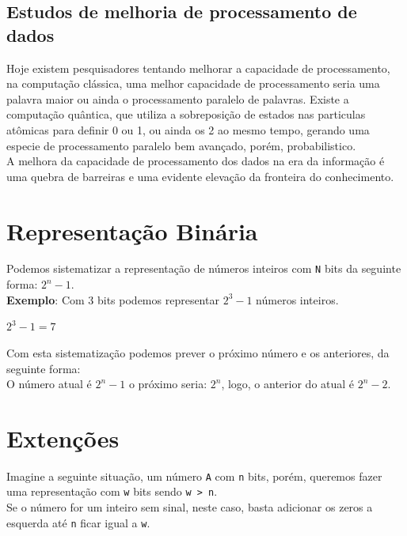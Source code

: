 \documentclass[12pt, onecolumn]{article}
\begin{document}
	\subsection{\centering Estudos de melhoria de processamento de dados}
	
	Hoje existem pesquisadores tentando melhorar a capacidade de processamento, 
	na computação clássica, uma melhor capacidade de processamento 
	seria uma palavra maior ou ainda o processamento paralelo de palavras. 
	Existe a computação quântica, que utiliza a sobreposição de estados 
	nas particulas atômicas para definir 0 ou 1, ou ainda os 2 ao mesmo 
	tempo, gerando uma especie de processamento paralelo bem avançado, 
	porém, probabilistico. \\
	\newline
	A melhora da capacidade de processamento dos dados na era da informação 
	é uma quebra de barreiras e uma evidente elevação da fronteira do 
	conhecimento.
		
	\section{\centering Representação Binária}
	
	Podemos sistematizar a representação de números inteiros com \texttt{N} bits
	da seguinte forma: $2^{n} - 1$. \\
	\newline
	\textbf{Exemplo}: Com 3 bits podemos representar $2^{3} - 1$ números 
	inteiros.
	\begin{center} 
		$2^{3} - 1 = 7$ \\
	\end{center}
	Com esta sistematização podemos prever o próximo número e os anteriores, 
	da seguinte forma: \\
	\newline
	O número atual é $2^{n} - 1$ o próximo seria: $2^{n}$, logo, o anterior
	do atual é $2^{n} - 2$.

	\section{\centering Extenções}
	
	Imagine a seguinte situação, um número \texttt{A} com \texttt{n} bits, porém,
	queremos fazer uma representação com \texttt{w} bits sendo \texttt{w > n}.\\
	\newline
	Se o número for um inteiro sem sinal, neste caso, basta adicionar os zeros
	a esquerda até \texttt{n} ficar igual a \texttt{w}.
	
\end{document}
